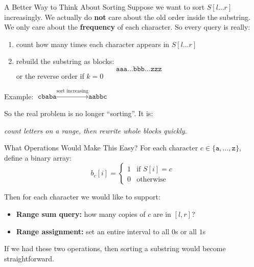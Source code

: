 \documentclass[aspectratio=169]{beamer}
\begin{document}
\begin{frame}{A Better Way to Think About Sorting}
    Suppose we want to sort \(S[l \dots r]\) increasingly. We actually do \textbf{not} care about the old order inside the substring. We only care about the \textbf{frequency} of each character. So every query is really:
    \begin{enumerate}
        \item count how many times each character appears in \(S[l \dots r]\)
        \item rebuild the substring as blocks:
        \[
        \texttt{aaa}\dots\texttt{bbb}\dots\texttt{zzz}
        \]
        or the reverse order if \(k=0\)
    \end{enumerate}

    Example: $\texttt{cbaba} \xrightarrow{\text{sort increasing}} \texttt{aabbc}$

    So the real problem is no longer ``sorting''.
    It is:
    \begin{center}
        \textit{count letters on a range, then rewrite whole blocks quickly.}
    \end{center}
\end{frame}

\begin{frame}{What Operations Would Make This Easy?}
    For each character \(c \in \{\texttt{a}, \dots, \texttt{z}\}\),
    define a binary array:
    \[
    b_c[i] =
    \begin{cases}
        1 & \text{if } S[i] = c \\
        0 & \text{otherwise}
    \end{cases}
    \]

    Then for each character we would like to support:
    \begin{itemize}
        \item \textbf{Range sum query:} how many copies of \(c\) are in
        \([l,r]\)?
        \item \textbf{Range assignment:} set an entire interval to all \(0\)s
        or all \(1\)s
    \end{itemize}

    If we had these two operations, then sorting a substring would become
    straightforward.
\end{frame}
\end{document}
